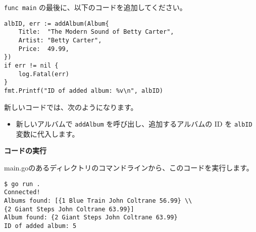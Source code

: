 \begin{enumerate}
  \texttt{func\ main} の最後に、以下のコードを追加してください。

\begin{lstlisting}[numbers=none]
albID, err := addAlbum(Album{
    Title:  "The Modern Sound of Betty Carter",
    Artist: "Betty Carter",
    Price:  49.99,
})
if err != nil {
    log.Fatal(err)
}
fmt.Printf("ID of added album: %v\n", albID)
\end{lstlisting}


  新しいコードでは、次のようになります。

  \begin{itemize}
  \item
    新しいアルバムで \texttt{addAlbum} を呼び出し、追加するアルバムの ID
    を \texttt{albID} 変数に代入します。
  \end{itemize}

\end{enumerate}


\textbf{コードの実行}

main.goのあるディレクトリのコマンドラインから、このコードを実行します。

\begin{lstlisting}[numbers=none]
$ go run .
Connected!
Albums found: [{1 Blue Train John Coltrane 56.99} \\
{2 Giant Steps John Coltrane 63.99}]
Album found: {2 Giant Steps John Coltrane 63.99}
ID of added album: 5
\end{lstlisting}

